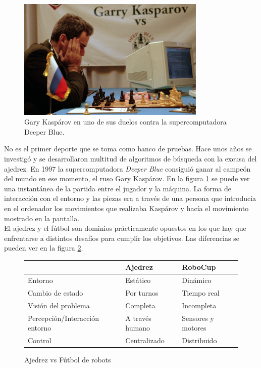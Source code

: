 \begin{figure}[h]
  \begin{center}
    \includegraphics[width=9cm]{img/cap1/chesschallenge}
  \end{center}
  \caption{Gary Kaspárov en uno de sus duelos contra la supercomputadora Deeper Blue.}
  \label{fig:chesschallenge}
\end{figure}

No es el primer deporte que se toma como banco de pruebas. Hace unos años se investigó y se desarrollaron multitud de algoritmos de búsqueda con la excusa del ajedrez. En 1997 la supercomputadora \textit{Deeper Blue} consiguió ganar al campeón del mundo en ese momento, el ruso Gary Kaspárov. En la figura \ref{fig:chesschallenge} se puede ver una instantánea de la partida entre el jugador y la máquina. La forma de interacción con el entorno y las piezas era a través de una persona que introducía en el ordenador los movimientos que realizaba Kaspárov y hacía el movimiento mostrado en la pantalla. \\

El ajedrez y el fútbol son dominios prácticamente opuestos en los que hay que enfrentarse a distintos desafíos para cumplir los objetivos. Las diferencias se pueden ver en la figura \ref{tab:chessvsrobocup}.\\

\begin{figure}[h]
\begin{center}
  \begin{tabular}{| l | l | l |}
    \hline
    & Ajedrez & RoboCup \\ \hline
    Entorno & Estático & Dinámico \\ \hline
    Cambio de estado & Por turnos & Tiempo real \\ \hline
    Visión del problema & Completa & Incompleta \\ \hline
    Percepción/Interacción entorno & A través humano & Sensores y motores \\ \hline
    Control & Centralizado & Distribuido \\ \hline
  \end{tabular}
  \caption{Ajedrez vs Fútbol de robots}
  \label{tab:chessvsrobocup}
\end{center}
\end{figure}

